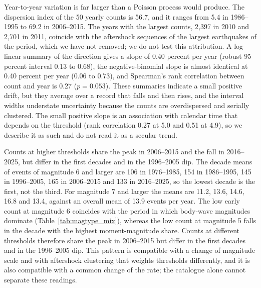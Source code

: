 \documentclass[11pt]{article}
\begin{document}
Year-to-year variation is far larger than a Poisson process would produce. The dispersion index of the 50 yearly counts is 56.7, and it ranges from 5.4 in 1986--1995 to 69.2 in 2006--2015.
The years with the largest counts, 2,397 in 2010 and 2,701 in 2011, coincide with the aftershock sequences of the largest earthquakes of the period, which we have not removed; we do not test this attribution.
A log-linear summary of the direction gives a slope of 0.40 percent per year (robust 95 percent interval 0.13 to 0.68), the negative-binomial slope is almost identical at 0.40 percent per year (0.06 to 0.73), and Spearman's rank correlation between count and year is 0.27 ($p = 0.053$).
These summaries indicate a small positive drift, but they average over a record that falls and then rises, and the interval widths understate uncertainty because the counts are overdispersed and serially clustered. The small positive slope is an association with calendar time that depends on the threshold (rank correlation 0.27 at 5.0 and 0.51 at 4.9), so we describe it as such and do not read it as a secular trend.

Counts at higher thresholds share the peak in 2006--2015 and the fall in 2016--2025, but differ in the first decades and in the 1996--2005 dip. The decade means of events of magnitude 6 and larger are 106 in 1976--1985, 154 in 1986--1995, 145 in 1996--2005, 165 in 2006--2015 and 133 in 2016--2025, so the lowest decade is the first, not the third.
For magnitude 7 and larger the means are 11.2, 13.6, 14.6, 16.8 and 13.4, against an overall mean of 13.9 events per year.
The low early count at magnitude 6 coincides with the period in which body-wave magnitudes dominate (Table~\ref{tab:magtype_mix}), whereas the low count at magnitude 5 falls in the decade with the highest moment-magnitude share. Counts at different thresholds therefore share the peak in 2006--2015 but differ in the first decades and in the 1996--2005 dip. This pattern is compatible with a change of magnitude scale and with aftershock clustering that weights thresholds differently, and it is also compatible with a common change of the rate; the catalogue alone cannot separate these readings.
\end{document}
